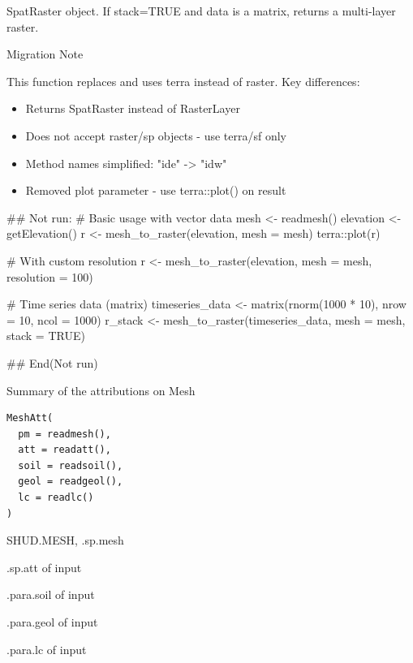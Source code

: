 \documentclass[a4paper]{book}
\begin{document}
%
\begin{Value}
SpatRaster object. If stack=TRUE and data is a matrix, returns
a multi-layer raster.
\end{Value}
%
\begin{Section}{Migration Note}

This function replaces  and uses terra instead of
raster. Key differences:
\begin{itemize}

\item{} Returns SpatRaster instead of RasterLayer
\item{} Does not accept raster/sp objects - use terra/sf only
\item{} Method names simplified: "ide" -> "idw"
\item{} Removed plot parameter - use terra::plot() on result

\end{itemize}

\end{Section}
%
\begin{Examples}
\begin{ExampleCode}
## Not run: 
# Basic usage with vector data
mesh <- readmesh()
elevation <- getElevation()
r <- mesh_to_raster(elevation, mesh = mesh)
terra::plot(r)

# With custom resolution
r <- mesh_to_raster(elevation, mesh = mesh, resolution = 100)

# Time series data (matrix)
timeseries_data <- matrix(rnorm(1000 * 10), nrow = 10, ncol = 1000)
r_stack <- mesh_to_raster(timeseries_data, mesh = mesh, stack = TRUE)

## End(Not run)
\end{ExampleCode}
\end{Examples}
%
\begin{Description}\relax
Summary of the attributions on Mesh
\end{Description}
%
\begin{Usage}
\begin{verbatim}
MeshAtt(
  pm = readmesh(),
  att = readatt(),
  soil = readsoil(),
  geol = readgeol(),
  lc = readlc()
)
\end{verbatim}
\end{Usage}
%
\begin{Arguments}
\begin{ldescription}
\item[\code{pm}] SHUD.MESH, .sp.mesh

\item[\code{att}] .sp.att of input

\item[\code{soil}] .para.soil of input

\item[\code{geol}] .para.geol of input

\item[\code{lc}] .para.lc of input
\end{ldescription}
\end{Arguments}
\end{document}
